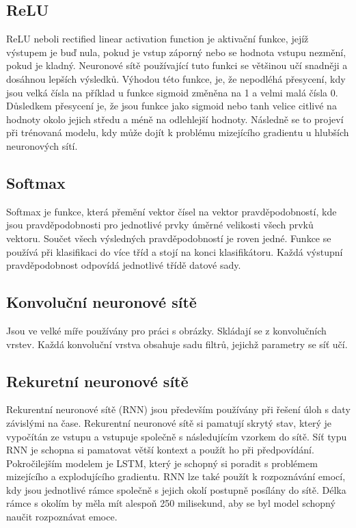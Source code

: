 \documentclass[FM,BP]{tulthesis}
\begin{document}
\subsection{ReLU}
ReLU neboli rectified linear activation function je aktivační funkce, jejíž výstupem je buď nula, pokud je vstup záporný nebo se hodnota vstupu nezmění, pokud je kladný. Neuronové sítě používající tuto funkci se většinou učí snadněji a dosáhnou lepších výsledků. Výhodou této funkce, je, že nepodléhá přesycení, kdy jsou velká čísla na příklad u funkce sigmoid změněna na 1 a velmi malá čísla 0. Důsledkem přesycení je, že jsou funkce jako sigmoid nebo tanh velice citlivé na hodnoty okolo jejich středu a méně na odlehlejší hodnoty. Následně se to projeví při trénovaná modelu, kdy může dojít k problému mizejícího gradientu u hlubších neuronových sítí\cite{brownlee_2020_ReLU}.

\subsection{Softmax}
Softmax je funkce, která přemění vektor čísel na vektor pravděpodobností, kde jsou pravděpodobnosti pro jednotlivé prvky úměrné velikosti všech prvků vektoru. Součet všech výsledných pravděpodobností je roven jedné. Funkce se používá při klasifikaci do více tříd a stojí na konci klasifikátoru. Každá výstupní pravděpodobnost odpovídá jednotlivé třídě datové sady\cite{brownlee_2020_Softmax}.

\subsection{Konvoluční neuronové sítě}
Jsou ve velké míře používány pro práci s obrázky. Skládají se z konvolučních vrstev. Každá konvoluční vrstva obsahuje sadu filtrů, jejichž parametry se síť učí. \cite{DBLP:journals/corr/abs-1912-10458}

\subsection{Rekuretní neuronové sítě}
Rekurentní neuronové sítě (RNN) jsou především používány při řešení úloh s daty závislými na čase. Rekurentní neuronové sítě si pamatují skrytý stav, který je vypočítán ze vstupu a vstupuje společně s následujícím vzorkem do sítě. Síť typu RNN je schopna si pamatovat větší kontext a použít ho při předpovídání. Pokročilejším modelem je LSTM, který je schopný si poradit s problémem mizejícího a explodujícího gradientu. RNN lze také použít k rozpoznávání emocí, kdy jsou jednotlivé rámce společně s jejich okolí postupně posílány do sítě. Délka rámce s okolím by měla mít alespoň 250 milisekund, aby se byl model schopný naučit rozpoznávat emoce. \cite{DBLP:journals/corr/abs-1912-10458}
\end{document}
